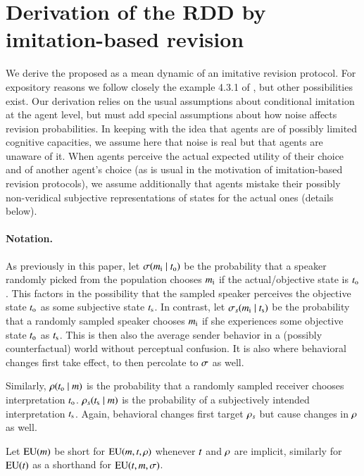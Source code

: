 \documentclass[fleqn,reqno,10pt]{article}
\newcommand{\rdd}{\acro{rdd}} %
\begin{document}
\section*{Derivation of the RDD by imitation-based revision}

We derive the proposed \rdd as a mean dynamic of an imitative revision
protocol. For expository reasons we follow closely the example 4.3.1
of \citet{Sandholm2010:Population-Game}, but other possibilities
exist. Our derivation relies on the usual assumptions about
conditional imitation at the agent level, but must add special
assumptions about how noise affects revision probabilities. In keeping
with the idea that agents are of possibly limited cognitive
capacities, we assume here that noise is real but that agents are
unaware of it. When agents perceive the actual expected utility of
their choice and of another agent's choice (as is usual in the
motivation of imitation-based revision protocols), we assume
additionally that agents mistake their possibly non-veridical
subjective representations of states for the actual ones (details
below).

\paragraph{Notation.} As previously in this paper, let
$\sigma(m_{\mathrm{i}} \mid t_{\mathrm{o}})$ be the probability that a
speaker randomly picked from the population chooses $m_{\mathrm{i}}$ if
the actual/objective state is $t_{\mathrm{o}}$. This factors in the
possibility that the sampled speaker perceives the objective state
$t_{\mathrm{o}}$ as some subjective state $t_{\mathrm{s}}$. In contrast, let
$\sigma_s(m_{\mathrm{i}} \mid t_{\mathrm{s}})$ be the probability that
a randomly sampled speaker chooses $m_{\mathrm{i}}$ if she experiences
some objective state $t_{\mathrm{o}}$ as $t_{\mathrm{s}}$. This is then also
the average sender behavior in a (possibly counterfactual) world
without perceptual confusion. It is also where behavioral changes
first take effect, to then percolate to $\sigma$ as well.

Similarly, $\rho(t_{\mathrm{o}} \mid m)$ is the probability
that a randomly sampled receiver chooses interpretation
$t_{\mathrm{o}}$. $\rho_s(t_{\mathrm{s}} \mid m)$ is the
probability of a subjectively intended interpretation
$t_{\mathrm{s}}$. Again, behavioral changes first target $\rho_s$ but
cause changes in $\rho$ as well.

Let $\mathrm{EU}(m)$ be short for $\mathrm{EU}(m,t,\rho)$ whenever
$t$ and $\rho$ are implicit, similarly for $\mathrm{EU}(t)$ as a
shorthand for $\mathrm{EU}(t,m,\sigma)$.
\end{document}
